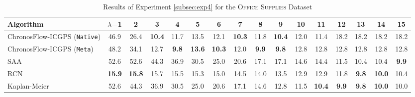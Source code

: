 \documentclass[11pt]{article}
\renewcommand{\arraystretch}{1.15}
\renewcommand{\arraystretch}{0.88}
\begin{document}
\begin{table}[h]
\centering
\caption{Results of Experiment \ref{subsec:exp4} for the \textsc{Office Supplies} Dataset}
\footnotesize
\setlength{\tabcolsep}{3pt}
\renewcommand{\arraystretch}{1.05}
\begin{adjustbox}{max width=\textwidth,center}
\begin{tabular}{l*{15}{c}}
\toprule
Algorithm & $\lambda$=1 & 2 & 3 & 4 & 5 & 6 & 7 & 8 & 9 & 10 & 11 & 12 & 13 & 14 & 15 \\
\midrule
ChronosFlow-ICGPS (\texttt{Native}) & 46.9 & 26.4 & \textbf{10.4} & 11.7 & 13.5 & 12.1 & \textbf{10.3} & 11.8 & \textbf{10.4} & 12.0 & 11.4 & 18.2 & 18.2 & 18.2 & 18.2 \\
ChronosFlow-ICGPS (\texttt{Meta}) & 48.2 & 34.1 & 12.7 & \textbf{9.8} & \textbf{13.6} & \textbf{10.3} & 12.0 & \textbf{9.9} & \textbf{9.8} & 12.8 & 12.8 & 12.8 & 12.8 & 12.8 & 12.8 \\
SAA & 52.6 & 52.6 & 44.3 & 36.9 & 30.5 & 25.0 & 20.6 & 17.1 & 17.1 & 14.6 & 14.4 & 11.5 & 10.4 & 10.4 & \textbf{9.9} \\
RCN \citep{hssaine2024censored} & \textbf{15.9} & \textbf{15.8} & 15.7 & 15.5 & 15.3 & 15.0 & 14.5 & 14.0 & 13.5 & 12.9 & 12.9 & 11.8 & \textbf{9.8} & \textbf{10.0} & 10.4 \\
Kaplan-Meier & 52.6 & 44.3 & 36.9 & 30.5 & 25.0 & 20.6 & 17.1 & 14.6 & 12.8 & 11.5 & \textbf{10.4} & \textbf{9.9} & \textbf{9.8} & \textbf{10.0} & 10.0 \\
\bottomrule
\end{tabular}
\end{adjustbox}
\label{tab:exp4-real_2}
\end{table}
\end{document}
